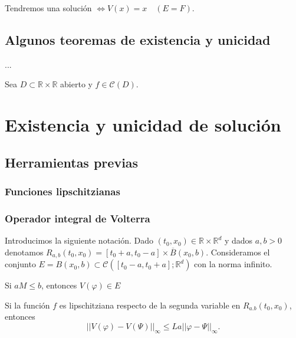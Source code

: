 \documentclass{article}
\begin{document}
  Tendremos una solución $\Leftrightarrow V(x) = x \quad (E=F)$.

\subsection{Algunos teoremas de existencia y unicidad}

\begin{thm}
  ...
\end{thm}

\begin{thm}
  Sea $D \subset \mathbb{R} \times \mathbb{R}$ abierto y $f \in \mathcal{C}(D)$.
\end{thm}

\section{Existencia y unicidad de solución} \label{sec:eu}

\subsection{Herramientas previas}

\subsubsection{Funciones lipschitzianas}

\subsubsection{Operador integral de Volterra}

Introducimos la siguiente notación. Dado $(t_0, x_0) \in \mathbb{R} \times \mathbb{R}^d$ y dados
$a,b > 0$ denotamos $R_{a,b}(t_0, x_0) = [t_0+a, t_0-a] \times \overline{B}(x_0, b)$. Consideramos
el conjunto $E = B(x_0, b) \subset \mathcal{C}([t_0-a, t_0+a]; \mathbb{R}^d)$ con la norma infinito.

\begin{lem}
  Si $aM \le b$, entonces $V(\varphi) \in E$
\end{lem}

\begin{lem}
  Si la función $f$ es lipschitziana respecto de la segunda variable en $R_{a.b}(t_0, x_0)$,
  entonces
  \[||V(\varphi) - V(\Psi)||_{\infty} \le La||\varphi - \Psi||_\infty.\]
\end{lem}
\end{document}
